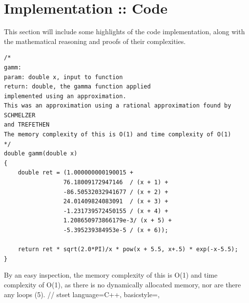 \documentclass[12pt]{article}
\begin{document}
\section{Implementation :: Code}
This section will include some highlights of the code implementation, along with the mathematical reasoning and proofs of their complexities.
\lstset { 
    language=C++,
    basicstyle=\footnotesize,
}
\begin{lstlisting}
/*
gamm:
param: double x, input to function
return: double, the gamma function applied
implemented using an approximation.
This was an approximation using a rational approximation found by SCHMELZER
and TREFETHEN
The memory complexity of this is O(1) and time complexity of O(1)
*/
double gamm(double x) 
{
    double ret = (1.000000000190015 + 
                 76.18009172947146  / (x + 1) +  
                 -86.50532032941677 / (x + 2) + 
                 24.01409824083091  / (x + 3) +  
                 -1.231739572450155 / (x + 4) + 
                 1.208650973866179e-3/ (x + 5) + 
                 -5.395239384953e-5 / (x + 6));
    
    return ret * sqrt(2.0*PI)/x * pow(x + 5.5, x+.5) * exp(-x-5.5);
}
\end{lstlisting}
By an easy inspection, the memory complexity of this is O(1) and time complexity of O(1), as there is no dynamically allocated memory, nor are there any loops (5).
//
stset { 
    language=C++,
    basicstyle=\footnotesize,
}
\end{document}
